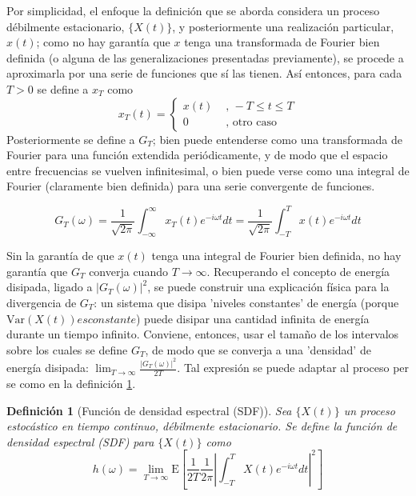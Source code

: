 \documentclass[12pt,a4paper]{mitthesis}
\newtheorem{defn}{Definici\'on}
\newcommand{\intR}{\int_{-\infty}^{\infty}}
\newcommand{\E}[1]{\mathrm{E}\left[ #1 \right]}
\newcommand{\Var}[1]{\mathrm{Var}\left( #1 \right)}
\newcommand{\abso}[1]{\left| #1 \right|}
\begin{document}
Por simplicidad, el enfoque la definici\'on que se aborda considera un proceso d\'ebilmente 
estacionario, $\{X(t)\}$, y posteriormente una realizaci\'on particular, $x(t)$; como no hay 
garant\'ia que $x$ tenga una transformada de Fourier bien definida (o alguna de las 
generalizaciones presentadas previamente), se procede a aproximarla por una serie de funciones que 
s\'i las tienen.
As\'i entonces, para cada $T>0$ se define a $x_T$ como
\begin{equation*}
x_T(t) = 
\begin{cases}
x(t) & \text{ , } -T\leq t \leq T \\
0 & \text{ , otro caso}
\end{cases}
\end{equation*}
Posteriormente se define a $G_T$; bien puede entenderse como una transformada de Fourier para una 
funci\'on extendida peri\'odicamente, y de modo que el espacio entre frecuencias se vuelven 
infinitesimal, o bien puede verse como una integral de Fourier (claramente bien definida) para una 
serie convergente de funciones.

\begin{equation*}
G_T (\omega) = \frac{1}{\sqrt{2 \pi}} \intR x_T(t) e^{-i \omega t} dt
= \frac{1}{\sqrt{2 \pi}} \int_{-T}^{T} x(t) e^{-i \omega t} dt
\end{equation*}

Sin la garant\'ia de que $x(t)$ tenga una integral de Fourier bien definida, no hay garant\'ia 
que $G_T$ converja cuando $T\rightarrow \infty$. Recuperando el concepto de energ\'ia disipada, 
ligado a $\left| G_T(\omega) \right|^{2}$, se puede construir una explicaci\'on f\'isica para la 
divergencia de $G_T$: un sistema que disipa 'niveles constantes' de energ\'ia (porque 
$\Var{X(t)} es constante$) puede disipar una cantidad infinita de energ\'ia durante un tiempo 
infinito. 
Conviene, entonces, usar el tama\~no de los intervalos sobre los cuales se define $G_T$, de modo 
que se converja a una 'densidad' de energ\'ia disipada:
$\lim_{T\rightarrow{\infty}} \frac{ \left| G_T(\omega) \right|^{2}}{2 T}$.
Tal expresi\'on se puede adaptar al proceso per se como en la definici\'on \ref{SDF}.

\begin{defn}[Funci\'on de densidad espectral (SDF)]
Sea $\{X(t)\}$ un proceso estoc\'astico en tiempo continuo, d\'ebilmente estacionario. Se define la 
funci\'on de densidad espectral (SDF) para $\{X(t)\}$ como
\begin{equation*}
h(\omega) = \lim_{T\rightarrow \infty} \E{ \frac{1}{2T} \frac{1}{2 \pi}
\abso{ \int_{-T}^{T} X(t) e^{-i \omega t} dt}^{2} }
\end{equation*}
\label{SDF}
\end{defn}
\end{document}
